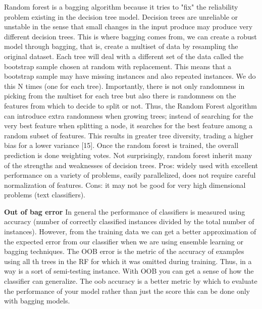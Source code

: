 \documentclass[preprint,12pt]{elsarticle}
\begin{document}
Random forest is a bagging algorithm because it tries to "fix" the reliability problem existing in the decision tree model. Decision trees are unreliable or unstable in the sense that small changes in the input produce may produce very different decision trees. This is where bagging comes from, we can create a robust model through bagging, that is, create a multiset of data by resampling the original dataset. Each tree will deal with a different set of the data called the bootstrap sample chosen at random with replacement. This means that a bootstrap sample may have missing instances and also repeated instances. We do this N times (one for each tree). Importantly, there is not only randomness in picking from the multiset for each tree but also there is randomness on the features from which to decide to split or not. Thus, the Random Forest algorithm can introduce extra randomness when growing trees; instead of searching for the very best feature when splitting a node, it searches for the best feature among a random subset of features. This results in greater tree diversity, trading a higher bias for a lower variance [15]. Once the random forest is trained, the overall prediction is done weighting votes.
Not surprisingly, random forest inherit many of the strengths and weaknesses of decision trees. Pros: widely used with excellent performance on a variety of problems, easily parallelized, does not require careful normalization of features. Cons: it may not be good for very high dimensional problems (text classifiers).

\textbf{Out of bag error}
In general the performance of classifiers is measured using accuracy (number of correctly classified instances divided by the total number of instances). However, from the training data we can get a better approximation of the expected error from our classifier when we are using ensemble learning or bagging techniques. 
The OOB error is the metric of the accuracy of examples using all th trees in the RF for which it was omitted during training. Thus, in a way is a sort of semi-testing instance. With OOB you can get a sense of how the classifier can generalize.
The oob accuracy is a better metric by which to evaluate the performance of your model rather than just the score this can be done only with bagging models.
\end{document}
